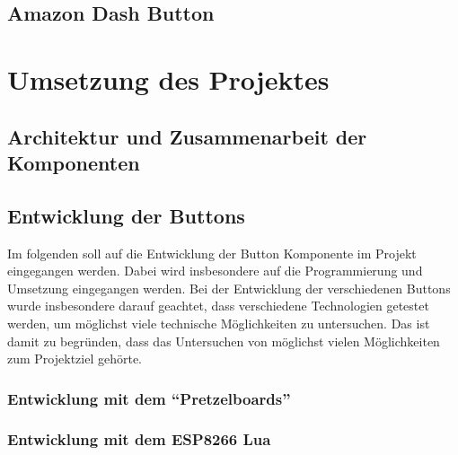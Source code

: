 \documentclass[ngerman]{scrartcl} %
\begin{document}


\subsection{Amazon Dash Button}
\label{sec:Amazon Dash Button}


\newpage

\section{Umsetzung des Projektes}        
\label{sec:Umsetzung des Projektes-1}  

\subsection{Architektur und Zusammenarbeit der Komponenten}        
\label{sec:Architektur und Zusammenarbeit der Komponenten-1} 



\newpage

\subsection{Entwicklung der Buttons}  
\label{sec:Entwicklung der Buttons-1} 

Im folgenden soll auf die Entwicklung der Button Komponente im Projekt eingegangen werden. Dabei wird insbesondere auf die Programmierung und Umsetzung eingegangen werden. 
Bei der Entwicklung der verschiedenen Buttons wurde insbesondere darauf geachtet, dass verschiedene Technologien getestet werden, um möglichst viele technische Möglichkeiten zu untersuchen. Das ist damit zu begründen, dass das Untersuchen von möglichst vielen Möglichkeiten zum Projektziel gehörte. 

\subsubsection{Entwicklung mit dem ``Pretzelboards''}  
\label{sec:Entwicklung mit dem ``Pretzelboards''-1}

\subsubsection{Entwicklung mit dem ESP8266 Lua}  
\label{sec:Entwicklung mit dem ESP8266-1}
\end{document}
